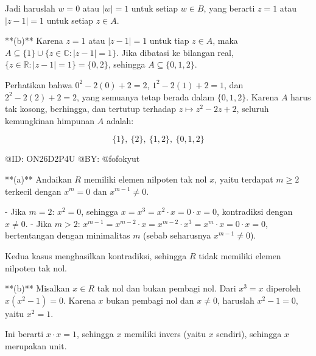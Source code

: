 Jadi haruslah $w=0$ atau $|w|=1$ untuk setiap $w \in B$, yang berarti $z=1$ atau $|z-1|=1$ untuk setiap $z \in A$.

**(b)** Karena $z=1$ atau $|z-1|=1$ untuk tiap $z\in A$, maka $A \subseteq \{1\}\cup\{z\in\mathbb{C}:|z-1|=1\}$. Jika dibatasi ke bilangan real, $\{z\in\mathbb{R}:|z-1|=1\} = \{0,2\}$, sehingga $A \subseteq \{0,1,2\}$.

Perhatikan bahwa $0^2-2(0)+2=2$, $1^2-2(1)+2=1$, dan $2^2-2(2)+2=2$, yang semuanya tetap berada dalam $\{0,1,2\}$. Karena $A$ harus tak kosong, berhingga, dan tertutup terhadap $z \mapsto z^2-2z+2$, seluruh kemungkinan himpunan $A$ adalah:

$$
\{1\},\ \{2\},\ \{1,2\},\ \{0,1,2\}
$$

@ID: ON26D2P4U
@BY: @fofokyut

**(a)** Andaikan $R$ memiliki elemen nilpoten tak nol $x$, yaitu terdapat $m\ge 2$ terkecil dengan $x^m=0$ dan $x^{m-1}\ne 0$.

- Jika $m=2$: $x^2=0$, sehingga $x = x^3 = x^2\cdot x = 0\cdot x = 0$, kontradiksi dengan $x\ne 0$.
- Jika $m>2$: $x^{m-1} = x^{m-2}\cdot x = x^{m-2}\cdot x^3 = x^{m}\cdot x = 0\cdot x = 0$, bertentangan dengan minimalitas $m$ (sebab seharusnya $x^{m-1}\ne 0$).

Kedua kasus menghasilkan kontradiksi, sehingga $R$ tidak memiliki elemen nilpoten tak nol.

**(b)** Misalkan $x\in R$ tak nol dan bukan pembagi nol. Dari $x^3=x$ diperoleh $x(x^2-1)=0$. Karena $x$ bukan pembagi nol dan $x\ne 0$, haruslah $x^2-1=0$, yaitu $x^2=1$.

Ini berarti $x\cdot x = 1$, sehingga $x$ memiliki invers (yaitu $x$ sendiri), sehingga $x$ merupakan unit.